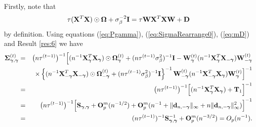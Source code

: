 \documentclass[11pt]{article}
\newtheorem{Main Result}{Main Result}
\def\vectorfontone{\bf}
\def\vectorfonttwo{\boldsymbol}
\def\vd{{\vectorfontone d}}                      %
\def\vu{{\vectorfontone u}}                      %
\def\vgamma{{\vectorfonttwo \gamma}}             %
\def\matrixfontone{\bf}
\def\matrixfonttwo{\boldsymbol}
\def\mD{{\matrixfontone D}}                      %
\def\mI{{\matrixfontone I}}                      %
\def\mO{{\matrixfontone O}}                      %
\def\mS{{\matrixfontone S}}                      %
\def\mT{{\matrixfontone T}}                      %
\def\mW{{\matrixfontone W}}                      %
\def\mX{{\matrixfontone X}}                      %
\def\mSigma{{\matrixfonttwo \Sigma}}             %
\def\mOmega{{\matrixfonttwo \Omega}}             %
\def\ds{\displaystyle}
\newcommand{\cyc}[1]{{\color{black}#1}}
\begin{document}
 Firstly, note that
\begin{equation}\label{eq:mD}
\tau (\mX^{T}\mX)\odot\mOmega + \sigma_\beta^{-2}\mI= \tau\mW\mX^T\mX\mW + \mD
\end{equation}
by definition. Using equations (\ref{eq:Pgamma}), (\ref{eq:SigmaRearrange0}), (\ref{eq:mD}) and Result \ref{res:6}
we have
\begin{eqnarray}
\ds \mSigma_{\vgamma,\vgamma}^{(t)}
& \ds =& \big(n\tau^{\cyc{(t-1)}}\big)^{-1}\Big[
(n^{-1}\mX_{\vgamma}^{T}\mX_{\vgamma}) \odot\mOmega_{\vgamma}^{(t)} +
(n\tau^{\cyc{(t-1)}}\sigma_\beta^2)^{-1}\mI
- \mW_{\vgamma}^{(t)}(n^{-1}\mX_{\vgamma}^{T}\mX_{-\vgamma})\mW_{-\vgamma}^{(t)}\nonumber\\
& \ds &\times
\left\{
(n^{-1}\mX_{-\vgamma}^{T}\mX_{-\vgamma})\odot\mOmega_{-\vgamma}^{(t)}
+ (n\tau^{\cyc{(t-1)}}\sigma^2_\beta)^{-1}\mI
\right\}^{-1}
\mW_{-\vgamma}^{(t)}(n^{-1}\mX_{-\vgamma}^{T}\mX_{\vgamma})\mW_{\vgamma}^{(t)}
\Big]^{-1} \nonumber\\
& \ds =&\big(n\tau^{\cyc{(t-1)}}\big)^{-1}\Big[
(n^{-1}\mX_{\vgamma}^{T}\mX_{\vgamma}) + \mT_1
\Big]^{-1}\nonumber\\
& \ds =&\big(n\tau^{\cyc{(t-1)}}\big)^{-1}\Big[ \mS_{\vgamma,\vgamma} + \mO_p^m(n^{-1/2})  + \mO_p^m(n^{-1}
+ \|\vd_{n,-\vgamma}\|_\infty +  n\|\vd_{n,-\vgamma}\|^2_\infty )
\Big]^{-1}\nonumber\\
& \ds =&(n{\tau^{(t-1)}})^{-1}\mS_{\vgamma,\vgamma}^{-1} + \mO_p^m(n^{-3/2})=O_p(n^{-1})
.\label{eq:mSigma2}
\end{eqnarray}
\end{document}

